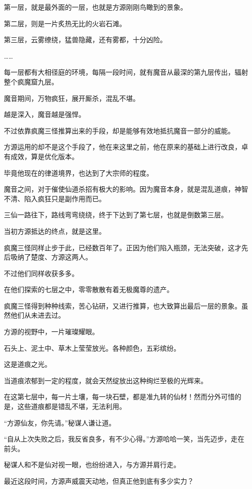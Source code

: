 \begin{this_body}
第一层，就是最外面的一层，也就是方源刚刚鸟瞰到的景象。

第二层，则是一片炙热无比的火岩石滩。

第三层，云雾缭绕，猛兽隐藏，还有雾都，十分凶险。

……

每一层都有大相径庭的环境，每隔一段时间，就有魔音从最深的第九层传出，辐射整个疯魔窟九层。

魔音期间，万物疯狂，展开厮杀，混乱不堪。

越是深入，魔音越是强悍。

不过依靠疯魔三怪推算出来的手段，却是能够有效地抵抗魔音一部分的威能。

方源运用的却不是这个手段了，他在来这里之前，他在原来的基础上进行改良，卓有成效，算是优化版本。

毕竟他现在的律道境界，也达到了大宗师的程度。

魔音之间，对于催使仙道杀招有极大的影响。因为魔音本身，就是混乱道痕，神智不清、陷入疯狂只是副作用而已。

三仙一路往下，路线弯弯绕绕，终于下达到了第七层，也就是倒数第三层。

当初方源抵达的终点，就是这里。

疯魔三怪同样止步于此，已经数百年了。正因为他们陷入瓶颈，无法突破，这才先后吸纳了楚度、方源这两人。

不过他们同样收获多多。

在他们探索的七层之中，零零散散有着无极魔尊的遗产。

疯魔三怪得到种种线索，苦心钻研，又进行推算，也大致算出最后一层的景象。虽然他们从未进去过。

方源的视野中，一片璀璨耀眼。

石头上、泥土中、草木上莹莹放光。各种颜色，五彩缤纷。

这是道痕之光。

当道痕浓郁到一定的程度，就会天然绽放出这种绚烂至极的光辉来。

在这第七层中，每一片土壤，每一块石壁，都是准九转的仙材！然而分外可惜的是，这些道痕都是错乱不堪，无法利用。

“方源仙友，你先请。”秘谋人谦让道。

“自从上次失败之后，我反省良多，有不少心得。”方源哈哈一笑，当先迈步，走在前头。

秘谋人和不是仙对视一眼，也纷纷进入，与方源并肩行走。

最近这段时间，方源声威震天动地，但真正他到底有多少实力？


\end{this_body}
